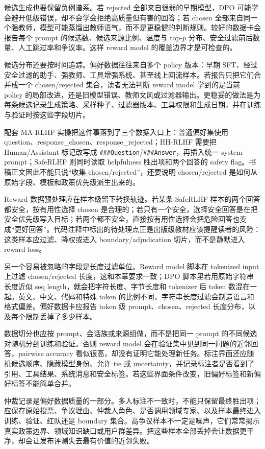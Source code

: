 \documentclass[UTF8,zihao=-4,openany]{ctexbook}
\begin{document}
候选生成也要保留负例谱系。若 rejected 全部来自很弱的早期模型，DPO 可能学会避开低级错误，却不会学会拒绝高质量但有害的回答；若 chosen 全部来自同一个强教师，模型可能蒸馏出教师语气，而不是更稳健的判断规则。较好的数据卡会报告每个 prompt 的候选数、候选来源比例、温度与 top-$p$ 分布、安全过滤前后数量、人工跳过率和争议率。这样 reward model 的覆盖边界才是可检查的。

候选分布还要按时间追踪。偏好数据往往来自多个 policy 版本：早期 SFT、经过安全过滤的助手、强教师、工具增强系统、甚至线上回流样本。若报告只把它们合并成一个 chosen/rejected 集合，读者无法判断 reward model 学到的是当前 policy 的局部改进，还是旧模型错误、教师文风或过滤器输出。更稳妥的做法是为每条候选记录生成策略、采样种子、过滤器版本、工具权限和生成日期，并在训练与验证时按这些字段切片。

配套 MA-RLHF 实操把这件事落到了三个数据入口上：普通偏好集使用 question、response\_chosen、response\_rejected；HH-RLHF 需要把 Human/Assistant 标记改写成 \texttt{\#\#\#Question}/\texttt{\#\#\#Answer}，再插入统一 system prompt；SafeRLHF 则同时读取 helpfulness 胜出项和两个回答的 safety flag。书稿正文因此不能只说“收集 chosen/rejected”，还要说明 chosen/rejected 是如何从原始字段、模板和政策优先级派生出来的。

Reward 数据预处理应在样本级留下转换轨迹。若某条 SafeRLHF 样本的两个回答都安全，按有用性选择 chosen 是合理的；若只有一个安全，选择安全回答是在把安全优先级写入目标；若两个都不安全，直接按有用性选择会把危险回答也变成“更好回答”。代码注释中标出的待处理点正是出版级教材应该提醒读者的风险：这类样本应过滤、降权或进入 boundary/adjudication 切片，而不是静默进入 reward loss。

另一个容易被忽略的字段是长度过滤单位。Reward model 脚本在 tokenized input 上过滤 chosen/rejected 长度，这和本章要求一致；DPO 脚本里若用原始字符串长度近似 seq length，就会把字符长度、字节长度和 tokenizer 后 token 数混在一起。英文、中文、代码和特殊 token 的比例不同，字符串长度过滤会制造语言和格式偏差。偏好数据卡应报告 token 级 prompt、chosen、rejected 长度分布，以及每个限制丢掉了多少样本。

数据切分也应按 prompt、会话族或来源组做，而不是把同一 prompt 的不同候选对随机分到训练和验证。否则 reward model 会在验证集中见到同一问题的近邻回答，pairwise accuracy 看似很高，却没有证明它能处理新任务。标注界面还应随机候选顺序、隐藏模型身份、允许 tie 或 uncertainty，并记录标注者是否看到了引用、工具结果、系统消息和安全标签。若这些界面条件改变，旧偏好标签和新偏好标签不能简单合并。

仲裁记录是偏好数据质量的一部分。多人标注不一致时，不能只保留最终胜出项；应保存原始投票、争议理由、仲裁人角色、是否调用领域专家、以及样本最终进入训练、验证、红队还是 boundary 集合。高争议样本不一定是噪声，它们常常揭示真实政策边界、领域知识缺口或用户群差异。把这些样本全部丢掉会让数据更干净，却会让发布评测失去最有价值的近邻失败。
\end{document}
